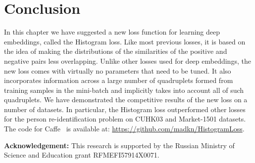 \section{Conclusion}
In this chapter we have suggested a new loss function for learning deep embeddings, called the Histogram loss. Like most previous losses, it is based on the idea of making the distributions of the similarities of the positive and negative pairs less overlapping. Unlike other losses used for deep embeddings, the new loss comes with virtually no parameters that need to be tuned. It also incorporates information across a large number of quadruplets formed from training samples in the mini-batch and implicitly takes into account all of such quadruplets. We have demonstrated the competitive results of the new loss on a number of datasets. In particular, the Histogram loss outperformed other losses for the person re-identification problem on CUHK03 and Market-1501 datasets. The code for Caffe~\citep{jia2014caffe} is available at: \url{https://github.com/madkn/HistogramLoss}.



\textbf{Acknowledgement:} This research is supported by the Russian Ministry of Science and Education grant RFMEFI57914X0071.

